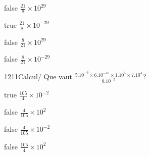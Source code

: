             \begin{reponses}
                \item[false] $\frac{21}{8}\times 10^{29}$
                \item[true] $\frac{21}{8}\times 10^{-29}$
                \item[false] $\frac{8}{21}\times 10^{29}$
                \item[false] $\frac{8}{21}\times 10^{-29}$
            \end{reponses}
            \begin{question}{1211}{Calcul}{}{/}
                Que vaut $\frac{5.10^{-6}\times 6.10^{-10}\times 1.10^{5}\times 7.10^{4}}{8.10^{-5}}$?
            \end{question}
            \begin{reponses}
                \item[true] $\frac{105}{4}\times 10^{-2}$
                \item[false] $\frac{4}{105}\times 10^{2}$
                \item[false] $\frac{4}{105}\times 10^{-2}$
                \item[false] $\frac{105}{4}\times 10^{2}$
            \end{reponses}
